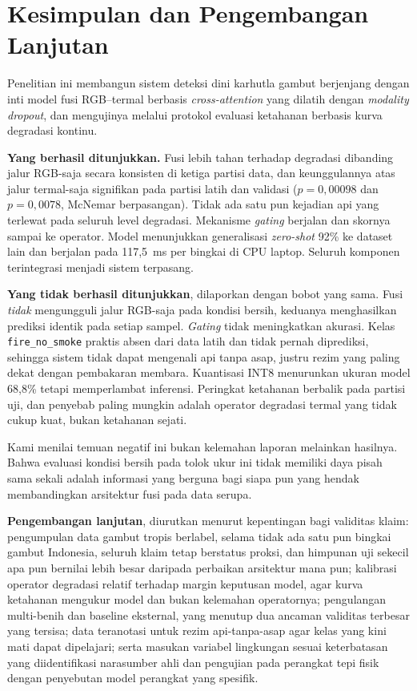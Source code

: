 
\section{Kesimpulan dan Pengembangan Lanjutan}

Penelitian ini membangun sistem deteksi dini karhutla gambut berjenjang dengan
inti model fusi RGB--termal berbasis \emph{cross-attention} yang dilatih dengan
\emph{modality dropout}, dan mengujinya melalui protokol evaluasi ketahanan
berbasis kurva degradasi kontinu.

\textbf{Yang berhasil ditunjukkan.} Fusi lebih tahan terhadap degradasi dibanding
jalur RGB-saja secara konsisten di ketiga partisi data, dan keunggulannya atas
jalur termal-saja signifikan pada partisi latih dan validasi ($p = 0{,}00098$ dan
$p = 0{,}0078$, McNemar berpasangan). Tidak ada satu pun kejadian api yang
terlewat pada seluruh level degradasi. Mekanisme \emph{gating} berjalan dan
skornya sampai ke operator. Model menunjukkan generalisasi \emph{zero-shot} 92\%
ke dataset lain dan berjalan pada 117,5~ms per bingkai di CPU laptop. Seluruh
komponen terintegrasi menjadi sistem terpasang.

\textbf{Yang tidak berhasil ditunjukkan}, dilaporkan dengan bobot yang sama.
Fusi \emph{tidak} mengungguli jalur RGB-saja pada kondisi bersih, keduanya
menghasilkan prediksi identik pada setiap sampel. \emph{Gating} tidak
meningkatkan akurasi. Kelas \texttt{fire\_no\_smoke} praktis absen dari data
latih dan tidak pernah diprediksi, sehingga sistem tidak dapat mengenali api
tanpa asap, justru rezim yang paling dekat dengan pembakaran membara.
Kuantisasi INT8 menurunkan ukuran model 68,8\% tetapi memperlambat inferensi.
Peringkat ketahanan berbalik pada partisi uji, dan penyebab paling mungkin
adalah operator degradasi termal yang tidak cukup kuat, bukan ketahanan sejati.

Kami menilai temuan negatif ini bukan kelemahan laporan melainkan hasilnya.
Bahwa evaluasi kondisi bersih pada tolok ukur ini tidak memiliki daya pisah sama
sekali adalah informasi yang berguna bagi siapa pun yang hendak membandingkan
arsitektur fusi pada data serupa.

\textbf{Pengembangan lanjutan}, diurutkan menurut kepentingan bagi validitas
klaim: pengumpulan data gambut tropis berlabel, selama tidak ada satu pun
bingkai gambut Indonesia, seluruh klaim tetap berstatus proksi, dan himpunan uji
sekecil apa pun bernilai lebih besar daripada perbaikan arsitektur mana pun;
kalibrasi operator degradasi relatif terhadap margin keputusan model, agar kurva
ketahanan mengukur model dan bukan kelemahan operatornya; pengulangan
multi-benih dan baseline eksternal, yang menutup dua ancaman validitas terbesar
yang tersisa; data teranotasi untuk rezim api-tanpa-asap agar kelas yang kini
mati dapat dipelajari; serta masukan variabel lingkungan sesuai keterbatasan
yang diidentifikasi narasumber ahli dan pengujian pada perangkat tepi fisik
dengan penyebutan model perangkat yang spesifik.

